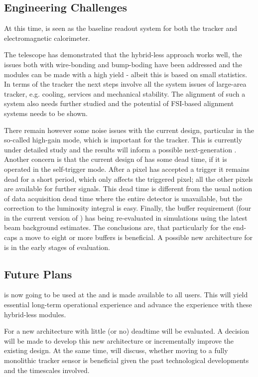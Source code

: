 \subsection{Engineering Challenges}
At this time, \KPIX is seen as the baseline readout system for both the \SID tracker and electromagnetic calorimeter. 

The \LYCORIS telescope has demonstrated that the hybrid-less approach works well, the issues both with wire-bonding and 
bump-boding have been addressed and the modules can be made with a high yield - albeit this is based on small statistics.
In terms of the \SID tracker the next steps involve all the system issues of large-area tracker, e.g. cooling, services and mechanical stability. 
The alignment of such a system also needs further studied and the potential of FSI-based alignment systems needs to be shown. 

There remain however some noise issues with the current \KPIX design, particular in the so-called high-gain mode, 
which is important for the tracker. This is currently under detailed study and the results will inform a possible 
next-generation \KPIX. Another concern is that the current design of \KPIX has some dead time, if it is operated in the self-trigger mode. 
After a pixel has accepted a trigger it remains dead for a short period, which only affects the triggered pixel; all the other 
pixels are available for further signals. This dead time is different from the usual 
notion of data acquisition dead time where the entire detector is unavailable, 
but the correction to the luminosity integral is easy. Finally, the buffer 
requirement (four in the current version of \KPIX) has being re-evaluated in \SID  
simulations using the latest beam background estimates. The conclusions are, that particularly for 
the end-caps a move to eight or more buffers is beneficial. A possible new architecture for \KPIX is in 
the early stages of evaluation.


\subsection{Future Plans}
\LYCORIS is now going to be used at the \DIITBF and is made available to all users. This will yield essential long-term operational experience and 
advance the experience with these hybrid-less modules.  

For \KPIX a new architecture with little (or no) deadtime will be evaluated. A decision will be made to develop this new architecture or incrementally 
improve the existing design. At the same time, \SID will discuss, whether moving to a fully monolithic tracker sensor is beneficial given the past technological 
developments and the timescales involved.
	
